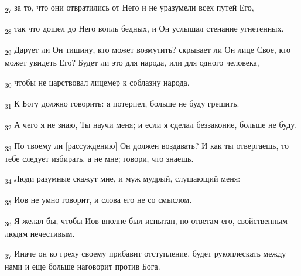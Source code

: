 \begin{tcolorbox}
\textsubscript{27} за то, что они отвратились от Него и не уразумели всех путей Его,
\end{tcolorbox}
\begin{tcolorbox}
\textsubscript{28} так что дошел до Него вопль бедных, и Он услышал стенание угнетенных.
\end{tcolorbox}
\begin{tcolorbox}
\textsubscript{29} Дарует ли Он тишину, кто может возмутить? скрывает ли Он лице Свое, кто может увидеть Его? Будет ли это для народа, или для одного человека,
\end{tcolorbox}
\begin{tcolorbox}
\textsubscript{30} чтобы не царствовал лицемер к соблазну народа.
\end{tcolorbox}
\begin{tcolorbox}
\textsubscript{31} К Богу должно говорить: я потерпел, больше не буду грешить.
\end{tcolorbox}
\begin{tcolorbox}
\textsubscript{32} А чего я не знаю, Ты научи меня; и если я сделал беззаконие, больше не буду.
\end{tcolorbox}
\begin{tcolorbox}
\textsubscript{33} По твоему ли [рассуждению] Он должен воздавать? И как ты отвергаешь, то тебе следует избирать, а не мне; говори, что знаешь.
\end{tcolorbox}
\begin{tcolorbox}
\textsubscript{34} Люди разумные скажут мне, и муж мудрый, слушающий меня:
\end{tcolorbox}
\begin{tcolorbox}
\textsubscript{35} Иов не умно говорит, и слова его не со смыслом.
\end{tcolorbox}
\begin{tcolorbox}
\textsubscript{36} Я желал бы, чтобы Иов вполне был испытан, по ответам его, свойственным людям нечестивым.
\end{tcolorbox}
\begin{tcolorbox}
\textsubscript{37} Иначе он ко греху своему прибавит отступление, будет рукоплескать между нами и еще больше наговорит против Бога.
\end{tcolorbox}

